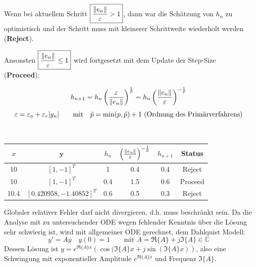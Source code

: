         
        \begin{minipage}{7.5cm}
          Wenn bei aktuellem Schritt $\boxed{\frac{\Arrowvert e_n \Arrowvert}{\varepsilon} > 1}$, dann war die
          Schätzung von $h_n$ zu optimistisch und der Schritt muss mit kleinerer Schrittweite wiederholt
          werden (\textbf{Reject}). 
          
          Ansonsten $\boxed{\frac{\Arrowvert e_n \Arrowvert}{\varepsilon} \leq 1}$ wird fortgesetzt mit dem Update der Step-Size (\textbf{Proceed}): 
          
          $$h_{n+1} = h_n \left( \frac{\varepsilon}{\Arrowvert e_n \Arrowvert} \right)^{\frac{1}{\tilde{p}}}= 
          h_n \left( \frac{\Arrowvert e_n \Arrowvert}{\varepsilon} \right)^{-\frac{1}{\tilde{p}}}$$
          $$\varepsilon=\varepsilon_a+\varepsilon_r|y_n|
           \text{\qquad mit\quad} \tilde{p} = \min(p, \hat{p})+1 \text{ (Ordnung des Primärverfahrens)}$$
        \end{minipage}
        \hspace{0.5cm}
        \begin{minipage}{10.5cm}
          \\
          \begin{tabular}{cccccc}
            \hline
            $x$ & $\bm y$ & $h_n$ & $\left( \frac{\Arrowvert e_n \Arrowvert}{\varepsilon} \right)^{-\frac{1}{\tilde{p}}}$ & $h_{n+1}$ & Status \\
            \hline
            $10$ & $[1, -1]^T$ & 1 & 0.4 & 0.4 & Reject\\
            10 & $[1,-1]^T$ & 0.4 & 1.5 & 0.6 & Proceed\\
            10.4 & $[0.420958, -1.40852]^T$ & 0.6 & 0.5 & 0.3 & Reject\\
            \hline
          \end{tabular}
        \end{minipage}
        
        
        
      Globaler relativer Fehler darf nicht divergieren, d.h. muss beschränkt sein. 
      Da die Analyse mit zu untersuchender ODE wegen fehlender Kenntnis über die Lösung sehr schwierig
      ist, wird mit allgemeiner ODE gerechnet, dem Dahlquist Modell: 
      $$y' = A y \quad y(0) = 1 \qquad \text{mit } A = \Re\{A\} + j \Im\{A\} \in \mathbb{C}$$
      Dessen Lösung ist $y = e^{\Re\{A\} x} \left( \cos(\Im\{A\}x + j \sin(\Im\{A\} x) \right)$, also 
      eine Schwingung mit exponentieller Amplitude $e^{\Re\{A\} x}$ und Frequenz $\Im\{A\}$.
      
